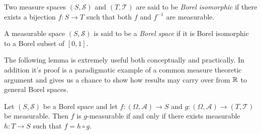 \begin{defn}Two measure spaces $(S, \mathcal{S})$ and $(T,
  \mathcal{T})$ are said to be \emph{Borel isomorphic} if there exists
  a bijection $f : S \to T$ such that both $f$ and $f^{-1}$ are measurable.
\end{defn}

\begin{defn}A measurable space $(S, \mathcal{S})$ is said to be a
  \emph{Borel space} if it is Borel isomorphic to a Borel subset of $[0,1]$.
\end{defn}

The following lemma is extremely useful both conceptually and
practically.  In addition it's proof is a paradigmatic example of a
common measure theoretic argument and gives us a chance to show how
results may carry over from $\mathbb{R}$ to general Borel spaces.
\begin{lem}\label{FunctionalRepresentation}Let $(S, \mathcal{S})$ be a
  Borel space and let $f : (\Omega, \mathcal{A}) \to S$ and $g :
  (\Omega, \mathcal{A}) \to (T,\mathcal{T})$ be measurable.  Then $f$
  is $g$-measurable if and only if there exists measurable $h :
  T  \to S$ such that $f = h \circ g$.
\end{lem}
